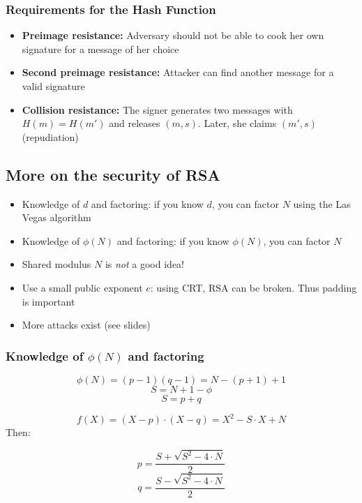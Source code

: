 \subsubsection{Requirements for the Hash Function}
\begin{itemize}
    \item \textbf{Preimage resistance:} Adversary should not be able to cook her own signature for a message of her choice
    \item \textbf{Second preimage resistance:} Attacker can find another message for a valid signature
    \item \textbf{Collision resistance:} The signer generates two messages with $H(m) = H(m')$ and releases $(m,s)$. Later, she claims $(m',s)$ (repudiation)
\end{itemize}

\subsection{More on the security of RSA}
\begin{itemize}
    \item Knowledge of $d$ and factoring: if you know $d$, you can factor $N$ using the Las Vegas algorithm
    \item Knowledge of $\phi(N)$ and factoring: if you know $\phi(N)$, you can factor $N$
    \item Shared modulus $N$ is \emph{not} a good idea!
    \item Use a small public exponent $e$: using CRT, RSA can be broken. Thus padding is important
    \item More attacks exist (see slides)
\end{itemize}

\subsubsection{Knowledge of \texorpdfstring{$\phi(N)$}{phi(N)} and factoring}
\[ \phi(N) = (p-1)(q-1) = N - (p+1) + 1\]
\[ S = N + 1 - \phi \]
\[ S = p + q \]

\[f(X) = (X - p)\cdot (X - q) = X^2 - S \cdot X + N\]
Then:

\[ p = \frac{S + \sqrt{S^2 - 4\cdot N}}{2} \]
\[ q = \frac{S - \sqrt{S^2 - 4\cdot N}}{2} \]

